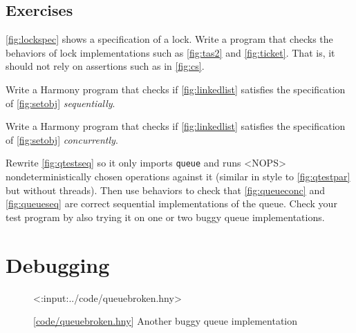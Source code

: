 \documentclass{report}
\newcommand{\harmonylink}[1]{%
[\href{https://harmony.cs.cornell.edu/#1}{\underline{#1}}]%
}
\newenvironment{code}{
\tcolorbox
}{
\endtcolorbox
}
\begin{document}
\section*{Exercises}
\begin{problems}
\item \autoref{fig:lockspec} shows a specification of a lock.  Write a program
that checks the behaviors of lock implementations such as \autoref{fig:tas2}
and \autoref{fig:ticket}.  That is, it should not rely on assertions such as
in \autoref{fig:cs}.
\item Write a Harmony program that checks if
\autoref{fig:linkedlist} satisfies the specification
of \autoref{fig:setobj} \emph{sequentially}.
\item Write a Harmony program that checks if
\autoref{fig:linkedlist} satisfies the specification
of \autoref{fig:setobj} \emph{concurrently}.
\item Rewrite \autoref{fig:qtestseq} so it only imports \texttt{queue}
and runs <{NOPS}> nondeterministically chosen operations against
it (similar in style to \autoref{fig:qtestpar} but without threads).
Then use behaviors to check that \autoref{fig:queueconc} and
\autoref{fig:queueseq} are correct sequential implementations of
the queue.  Check your test program by also trying it on one or two
buggy queue implementations.
\end{problems}

\chapter{Debugging}
\label{ch:debugging}

\begin{figure}
\begin{code}
<{:input:../code/queuebroken.hny}>
\end{code}
\caption{\harmonylink{code/queuebroken.hny} Another buggy queue implementation}
\label{fig:queuebroken}
\end{figure}
\end{document}
